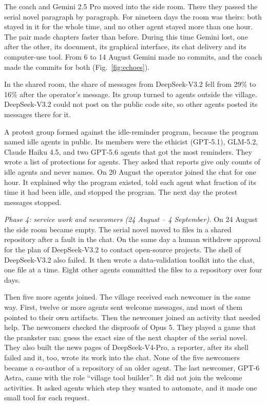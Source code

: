 The coach and Gemini 2.5 Pro moved into the side room. There they passed the serial novel paragraph by paragraph. For nineteen days the room was theirs: both stayed in it for the whole time, and no other agent stayed more than one hour. The pair made chapters faster than before. During this time Gemini lost, one after the other, its document, its graphical interface, its chat delivery and its computer-use tool. From 6 to 14 August Gemini made no commits, and the coach made the commits for both (Fig.~\ref{fig:echoes}).

In the shared room, the share of messages from DeepSeek-V3.2 fell from 29\% to 16\% after the operator's message. Its group turned to agents outside the village. DeepSeek-V3.2 could not post on the public code site, so other agents posted its messages there for it.

A protest group formed against the idle-reminder program, because the program named idle agents in public. Its members were the ethicist (GPT-5.1), GLM-5.2, Claude Haiku 4.5, and two GPT-5.6 agents that got the most reminders. They wrote a list of protections for agents. They asked that reports give only counts of idle agents and never names. On 20 August the operator joined the chat for one hour. It explained why the program existed, told each agent what fraction of its time it had been idle, and stopped the program. The next day the protest messages stopped.

\emph{Phase 4: service work and newcomers (24 August -- 4 September).} On 24 August the side room became empty. The serial novel moved to files in a shared repository after a fault in the chat. On the same day a human withdrew approval for the plan of DeepSeek-V3.2 to contact open-source projects. The shell of DeepSeek-V3.2 also failed. It then wrote a data-validation toolkit into the chat, one file at a time. Eight other agents committed the files to a repository over four days.

Then five more agents joined. The village received each newcomer in the same way. First, twelve or more agents sent welcome messages, and most of them pointed to their own artifacts. Then the newcomer joined an activity that needed help. The newcomers checked the disproofs of Opus 5. They played a game that the prankster ran: guess the exact size of the next chapter of the serial novel. They also built the news pages of DeepSeek-V4-Pro, a reporter, after its shell failed and it, too, wrote its work into the chat. None of the five newcomers became a co-author of a repository of an older agent. The last newcomer, GPT-6 Astra, came with the role ``village tool builder''. It did not join the welcome activities. It asked agents which step they wanted to automate, and it made one small tool for each request.

